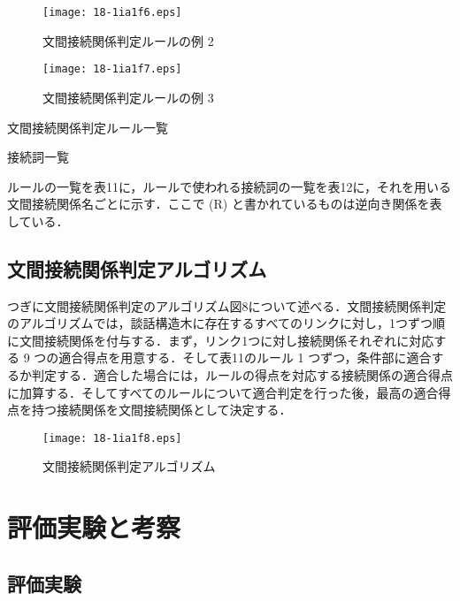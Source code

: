 \documentclass[japanese]{jnlp_1.4}
\begin{document}
\begin{figure}[t]
\begin{center}
\texttt{[image: 18-1ia1f6.eps]}
\end{center}
\caption{文間接続関係判定ルールの例 2}
\vspace{2\baselineskip}
\end{figure}
\begin{figure}[t]
\begin{center}
\texttt{[image: 18-1ia1f7.eps]}
\end{center}
\caption{文間接続関係判定ルールの例 3}
\end{figure}

\begin{table}[p]
\caption{文間接続関係判定ルール一覧}

\end{table}
\begin{table}[t]
\caption{接続詞一覧}

\end{table}

ルールの一覧を表11に，ルールで使われる接続詞の一覧を表12に，それを用いる文間接続関係名ごとに示す．ここで (R) と書かれているものは逆向き関係を表している．


\subsection{文間接続関係判定アルゴリズム}
\label{sec:mylabel17}

つぎに文間接続関係判定のアルゴリズム図8について述べる．文間接続関係判定のアルゴリズムでは，談話構造木に存在するすべてのリンクに対し，1つずつ順に文間接続関係を付与する．まず，リンク1つに対し接続関係それぞれに対応する 9 つの適合得点を用意する．そして表11のルール 1 つずつ，条件部に適合するか判定する．適合した場合には，ルールの得点を対応する接続関係の適合得点に加算する．そしてすべてのルールについて適合判定を行った後，最高の適合得点を持つ接続関係を文間接続関係として決定する．


\begin{figure}[t]
\begin{center}
\texttt{[image: 18-1ia1f8.eps]}
\end{center}
\caption{文間接続関係判定アルゴリズム}
\end{figure}

\section{評価実験と考察}

\subsection{評価実験}
\label{sec:mylabel18}
\end{document}
